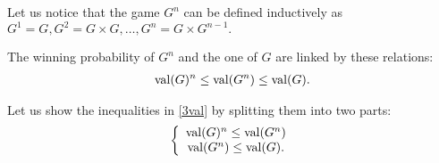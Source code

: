 Let us notice that the game $G^n$ can be defined inductively as $G^1=G, G^2=G \times G, \ldots, G^n=G\times G^{n-1}.$
 
The winning probability of $G^n$ and the one of $G$ are linked by these relations: \begin{align} \mathrm{val} (G)^n \leq \mathrm{val} (G^n) \leq \mathrm{val} (G). \label{3val}\end{align}

Let us show the inequalities in \eqref{3val} by splitting them into two parts: 
\begin{align}
\left\lbrace \begin{array}{c} \mathrm{val} (G)^n \leq \mathrm{val} (G^n) \\ \mathrm{val} (G^n) \leq \mathrm{val} (G).  \end{array}\right.
\end{align}

